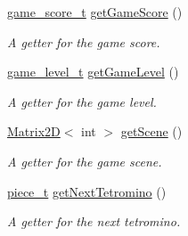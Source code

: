 \begin{DoxyCompactItemize}
\hyperlink{structgame__score__t}{game\+\_\+score\+\_\+t} \hyperlink{classTetreesEngine_a46108b9a7ea4ab8ebd27323f9752e208}{get\+Game\+Score} ()
\begin{DoxyCompactList}\small\item\em A getter for the game score. \end{DoxyCompactList}\item 
\hyperlink{structgame__level__t}{game\+\_\+level\+\_\+t} \hyperlink{classTetreesEngine_a7ad503b48ba753c446e5438ca67aa4e3}{get\+Game\+Level} ()
\begin{DoxyCompactList}\small\item\em A getter for the game level. \end{DoxyCompactList}\item 
\hyperlink{classMatrix2D}{Matrix2D}$<$ int $>$ \hyperlink{classTetreesEngine_a1f167b42fc077d496449a2cc959989ac}{get\+Scene} ()
\begin{DoxyCompactList}\small\item\em A getter for the game scene. \end{DoxyCompactList}\item 
\hyperlink{structpiece__t}{piece\+\_\+t} \hyperlink{classTetreesEngine_a78698174a309f2a4d74da9fd47167f56}{get\+Next\+Tetromino} ()
\begin{DoxyCompactList}\small\item\em A getter for the next tetromino. \end{DoxyCompactList}\end{DoxyCompactItemize}
